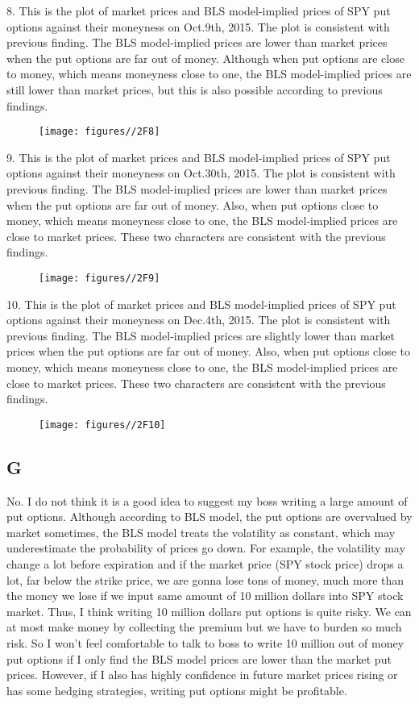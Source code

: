 \documentclass{report}
\begin{document}
8. This is the plot of market prices and BLS model-implied prices of SPY put options against their moneyness on Oct.9th, 2015. The plot is consistent with previous finding. The BLS model-implied prices are lower than market prices when the put options are far out of money. Although when put options are close to money, which means moneyness close to one, the BLS model-implied prices are still lower than market prices, but this is also possible according to previous findings.
\begin{figure}[H]
        \centering 
         \texttt{[image: figures//2F8]}
\end{figure}

9. This is the plot of market prices and BLS model-implied prices of SPY put options against their moneyness on Oct.30th, 2015. The plot is consistent with previous finding. The BLS model-implied prices are lower than market prices when the put options are far out of money. Also, when put options close to money, which means moneyness close to one, the BLS model-implied prices are close to market prices. These two characters are consistent with the previous findings.
\begin{figure}[H]
        \centering 
         \texttt{[image: figures//2F9]}
\end{figure}

10. This is the plot of market prices and BLS model-implied prices of SPY put options against their moneyness on Dec.4th, 2015. The plot is consistent with previous finding. The BLS model-implied prices are slightly lower than market prices when the put options are far out of money. Also, when put options close to money, which means moneyness close to one, the BLS model-implied prices are close to market prices. These two characters are consistent with the previous findings.
\begin{figure}[H]
        \centering 
         \texttt{[image: figures//2F10]}
\end{figure}

\subsection{G}
No. I do not think it is a good idea to suggest my boss writing a large amount of put options. Although according to BLS model, the put options are overvalued by market sometimes, the BLS model treats the volatility as constant, which may underestimate the probability of prices go down. For example, the volatility may change a lot before expiration and if the market price (SPY stock price) drops a lot, far below the strike price, we are gonna lose tons of money, much more than the money we lose if we input same amount of 10 million dollars into SPY stock market. Thus, I think writing 10 million dollars put options is quite risky. We can at most make money by collecting the premium but we have to burden so much risk. So I won't feel comfortable to talk to boss to write 10 million out of money put options if I only find the BLS model prices are lower than the market put prices. However, if I also has highly confidence in future market prices rising or has some hedging strategies, writing put options might be profitable.
\end{document}
